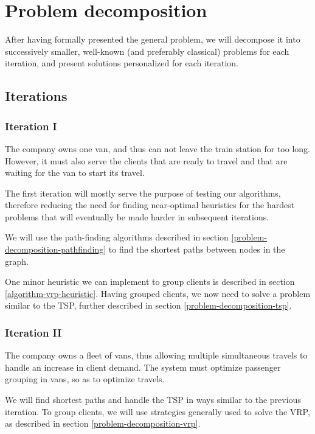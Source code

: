 \chapter{Problem decomposition} \label{problem-decomposition}
After having formally presented the general problem, we will decompose it into successively smaller, well-known (and preferably classical) problems for each iteration, and present solutions personalized for each iteration.

\section{Iterations} \label{problem-decomposition-iterations}
\subsection{Iteration I}
The company owns one van, and thus can not leave the train station for too long. However, it must also serve the clients that are ready to travel and that are waiting for the van to start its travel.\par
The first iteration will mostly serve the purpose of testing our algorithms, therefore reducing the need for finding near-optimal heuristics for the hardest problems that will eventually be made harder in subsequent iterations.\par
We will use the path-finding algorithms described in section \ref{problem-decomposition-pathfinding} to find the shortest paths between nodes in the graph.\par
One minor heuristic we can implement to group clients is described in section \ref{algorithm-vrp-heuristic}. Having grouped clients, we now need to solve a problem similar to the \acrshort{TSP}, further described in section \ref{problem-decomposition-tsp}.
\subsection{Iteration II}
The company owns a fleet of vans, thus allowing multiple simultaneous travels to handle an increase in client demand. The system must optimize passenger grouping in vans, so as to optimize travels.\par
We will find shortest paths and handle the \acrshort{TSP} in ways similar to the previous iteration. To group clients, we will use strategies generally used to solve the \acrshort{VRP}, as described in section \ref{problem-decomposition-vrp}.
